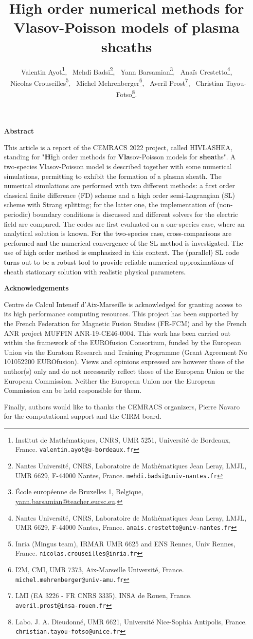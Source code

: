 \documentclass{article}
\title{High order numerical methods for Vlasov-Poisson models of plasma sheaths}
\author{
	Valentin Ayot\footnote{Institut de Math\'ematiques, CNRS, UMR 5251, Universit\'e de Bordeaux, France. \texttt{valentin.ayot@u-bordeaux.fr}}, 
	\ Mehdi Badsi\footnote{Nantes Universit\'e, CNRS, Laboratoire de Math\'ematiques Jean Leray, LMJL, UMR 6629, F-44000 Nantes, France. \texttt{mehdi.badsi@univ-nantes.fr}},
	\ Yann Barsamian\footnote{\'Ecole europ\'eenne de Bruxelles 1, Belgique, \url{yann.barsamian@teacher.eursc.eu}, \orcidlink{0000-0001-6602-0547}}, 
	\ Ana\"is Crestetto\footnote{Nantes Universit\'e, CNRS, Laboratoire de Math\'ematiques Jean Leray, LMJL, UMR 6629, F-44000 Nantes, France. \texttt{anais.crestetto@univ-nantes.fr}},\\
	\ Nicolas Crouseilles\footnote{Inria (Mingus team), IRMAR UMR 6625 and ENS Rennes, Univ Rennes, France. \texttt{nicolas.crouseilles@inria.fr}},
	\ Michel Mehrenberger\footnote{I2M, CMI, UMR 7373, Aix-Marseille Universit\'e, France. \texttt{michel.mehrenberger@univ-amu.fr}},
	\ Averil Prost\footnote{LMI (EA 3226 - FR CNRS 3335), INSA de Rouen, France. \texttt{averil.prost@insa-rouen.fr}}, 
	\ Christian Tayou-Fotso\footnote{Labo. J. A. Dieudonn\'e, UMR 6621, Universit\'e Nice-Sophia Antipolis, France. \texttt{christian.tayou-fotso@unice.fr}}.
 }
\date{}
\numberwithin{equation}{section}
\newcommand{\todo}[1]{{\color{red}\textbf{#1}}}
\newcommand{\highlight}[2]{ %
	\begin{center}
		\small
		\begin{minipage}{0.9\textwidth}
			\begin{center}
				\textbf{#1}
			\end{center}
			\vspace*{-7pt}
			#2
		\end{minipage}
	\end{center}
}
\begin{document}
	
\maketitle

\highlight{Abstract}{
	This article is a report of the CEMRACS 2022 project, called HIVLASHEA, standing for "{\bf Hi}gh order methods for {\bf Vla}sov-Poisson models for {\bf shea}ths".
	A two-species Vlasov-Poisson model is described together with some numerical simulations, permitting to exhibit the formation of a plasma sheath. 
	The numerical simulations are performed with two different methods: a first order classical finite difference (FD) scheme and a high order semi-Lagrangian (SL) scheme with Strang splitting; for the latter one, the implementation
	of (non-periodic) boundary conditions is discussed and different solvers for the electric field are compared.  
	The codes are first evaluated on a one-species case, where an analytical solution is known. \textcolor{black}{For the two-species case, 
	cross-comparisons are performed and the numerical convergence of the SL method is investigated. The use of high order method 
	is emphasized in this context. The (parallel) SL code turns out to be a robust tool to provide reliable numerical approximations of sheath stationary solution 
	with realistic physical parameters.  }
}

\highlight{Acknowledgements}{
	Centre de Calcul Intensif d'Aix-Marseille is acknowledged for granting access to its high performance computing resources. This project has been supported by  the French Federation for Magnetic Fusion Studies (FR-FCM) and by the French ANR project MUFFIN ANR-19-CE46-0004. 
	This work has been carried out within the framework of the EUROfusion Consortium, funded by the European Union via the Euratom Research and Training Programme (Grant Agreement No 101052200 EUROfusion). Views and opinions expressed are however those of the author(s) only and do not necessarily reflect those of the European Union or the European Commission. Neither the European Union nor the European Commission can be held responsible for them.
	
	
	
	Finally, authors would like to thanks the CEMRACS organizers, Pierre Navaro for the computational support and the CIRM board.
}
\end{document}
